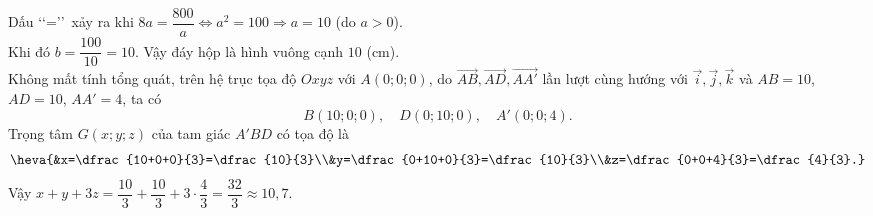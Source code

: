 \begin{ex}
{		Dấu \lq\lq=\rq\rq\ xảy ra khi $8a=\dfrac{800}{a}\Leftrightarrow a^2=100\Rightarrow a=10$ (do $a>0$).\\
		Khi đó $b=\dfrac{100}{10}=10$. Vậy đáy hộp là hình vuông cạnh $10$ (cm).\\
		Không mất tính tổng quát, trên hệ trục tọa độ $Oxyz$ với $A(0;0;0)$, do $\overrightarrow{AB},\overrightarrow{AD},\overrightarrow{AA'}$ lần lượt cùng hướng với $\overrightarrow{i},\overrightarrow{j},\overrightarrow{k}$ và $AB=10$, $AD=10$, $AA'=4$, ta có
		\[B(10;0;0),\quad D(0;10;0),\quad A'(0;0;4).\]
		Trọng tâm $G(x;y;z)$ của tam giác $A'BD$ có tọa độ là
		\[\heva{&x=\dfrac{10+0+0}{3}=\dfrac{10}{3}\\&y=\dfrac{0+10+0}{3}=\dfrac{10}{3}\\&z=\dfrac{0+0+4}{3}=\dfrac{4}{3}.}\]
		Vậy $x+y+3z=\dfrac{10}{3}+\dfrac{10}{3}+3\cdot \dfrac{4}{3}=\dfrac{32}{3}\approx10{,}7$.
	}
\end{ex}

